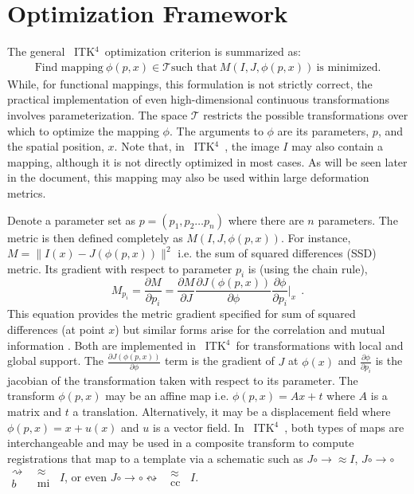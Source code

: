 \documentclass{llncs}
\newcommand{\bsp}{$\substack{
   \rightsquigarrow \\
   b
  }$}
\newcommand{\mi}{$\substack{
   \approx \\
   \text{mi}
  }$}
\newcommand{\cc}{$\substack{
   \approx \\
   \text{cc}
  }$}
\newcommand{\tk}{~ITK$^{\text{4}}$~}
\begin{document}
\section{Optimization Framework}
The general \tk optimization criterion is summarized as:
\begin{eqnarray}
\text{Find mapping}~\phi(p,x) \in \mathcal{T}
\text{such that}~M(I,J,\phi(p,x))~\text{is minimized}. 
\label{eq:gen}
\end{eqnarray}
While, for functional mappings, this formulation is not strictly correct, the
practical implementation of even high-dimensional continuous
transformations involves parameterization. 
The space $\mathcal{T}$ restricts the possible transformations over
which to optimize the mapping $\phi$.  The arguments to $\phi$ are its
parameters, $p$, and the spatial position, $x$.  Note that, in \tk,
the image $I$ may also contain a mapping, although it is not directly
optimized in most cases.  As will be seen later in the document, this
mapping may also be used within large deformation metrics. 

Denote a parameter set as $p = (p_1, p_2 \ldots p_n)$ where there are
$n$ parameters.  
The metric is then defined completely as $M(I,J,\phi(p,x))$.  For instance, $M=\|
I(x)-J(\phi(p,x)) \|^2$ i.e. the sum of squared differences (SSD) metric. Its gradient with respect to parameter $p_i$
is (using the chain rule), $$M_{p_i}=\frac{\partial M}{\partial
  p_i}=\frac{\partial M}{\partial J}\frac{\partial
  J(\phi(p,x))}{\partial \phi} \frac{\partial \phi}{\partial p_i}|_x
~~.$$  This equation provides the metric gradient specified for
sum of squared differences (at point $x$) but similar forms arise for the correlation
and mutual information \cite{hermosillo}.  Both are implemented in
\tk for transformations with local and global support.  The
$\frac{\partial J(\phi(p,x))}{\partial \phi}$ term is the gradient of $J$ at $\phi(x)$
and $\frac{\partial \phi}{\partial p_i}$ is the jacobian of the transformation taken
with respect to its parameter.   The transform $\phi(p,x)$ may be
an affine map i.e. $\phi(p,x)=A x + t$ where $A$ is a matrix and
$t$ a translation.  Alternatively, it may be a displacement field
where $\phi(p,x)=x+u(x)$ and
$u$ is a vector field.  In \tk, both types of maps are interchangeable
and may be used in a composite transform to compute registrations that
map to a template via a schematic such as $ J  \circ \rightarrow \approx I $, $ J  \circ
\rightarrow \circ $ \bsp ~\mi~$I$, or even $ J  \circ
\rightarrow \circ \leftrightsquigarrow $~\cc~$ I $.  
\end{document}
